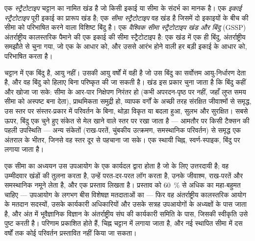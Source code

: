 \begin{definition}[सीमा स्ट्रैटोटाइप, इकाई स्ट्रैटोटाइप, GSSP]\label{def:b1:stratigraphic-scale:gssp}
एक \emph{स्ट्रैटोटाइप} चट्टान का नामित खंड है जो किसी इकाई या सीमा के संदर्भ का मानक है। एक \emph{इकाई स्ट्रैटोटाइप} पूरी इकाई का प्रारूप खंड है; एक \emph{सीमा स्ट्रैटोटाइप} वह खंड है जिसमें दो इकाइयों के बीच की सीमा को परिभाषित करने वाला विशिष्ट बिंदु है। एक \emph{वैश्विक सीमा स्ट्रैटोटाइप खंड और बिंदु} (GSSP) अंतर्राष्ट्रीय कालस्तरिक पैमाने की एक इकाई की सीमा स्ट्रैटोटाइप है: एक खंड में एक ही बिंदु, अंतर्राष्ट्रीय समझौते से चुना गया, जो एक  के आधार को, और उससे आरंभ होने वाली हर बड़ी इकाई के आधार को, परिभाषित करता है।
\end{definition}

 चट्टान में एक बिंदु है, आयु नहीं। उसकी आयु वर्षों में वही है जो उस बिंदु का सर्वोत्तम आयु-निर्धारण देता है, और वह बिंदु को हिलाए बिना परिष्कृत की जा सकती है। खंड इस प्रकार चुना जाता है कि बिंदु कहीं और खोजा जा सके: सीमा के आर-पार निक्षेपण निरंतर हो (कभी अपरदन-पृष्ठ पर नहीं, जहाँ लुप्त समय सीमा को अस्पष्ट बना देता), प्राथमिकता समुद्री हो, व्यापक वर्गों के अच्छी तरह संरक्षित जीवाश्मों से समृद्ध, उस स्तर पर संस्तर-प्रकार में परिवर्तन के बिना, थोड़ा विकृत या बदला हुआ, सुलभ और सुरक्षित। सबसे ऊपर, बिंदु एक चुने हुए संकेत से मेल खाने वाले स्तर पर रखा जाता है --- आमतौर पर किसी टैक्सन की पहली उपस्थिति --- अन्य संकेतों (राख-परतें, चुंबकीय उत्क्रमण, समस्थानिक परिवर्तन) से समृद्ध एक अंतराल के भीतर, जिनसे वह स्तर दूर से पहचाना जा सके। एक स्थायी चिह्न, स्वर्ण-स्पाइक, बिंदु पर लगाया जाता है।

\begin{inthefield}[सीमा कैसे चुनी जाती है]
एक सीमा का अध्ययन उस उपआयोग के एक कार्यदल द्वारा होता है जो  के लिए उत्तरदायी है; वह उम्मीदवार खंडों की तुलना करता है, उन्हें परत-दर-परत लॉग करता है, उनके जीवाश्म, राख-परतें और समस्थानिक नमूने लेता है, और एक प्रस्ताव लिखता है। प्रस्ताव को \qty{60}{\%} से अधिक का महा-बहुमत चाहिए --- उपआयोग के लगभग बीस विशेषज्ञ मतदाताओं का --- फिर वह अंतर्राष्ट्रीय कालस्तरिक आयोग के मतदान सदस्यों, उसके कार्यकारी अधिकारियों और उसके सत्रह उपआयोगों के अध्यक्षों के पास जाता है, और अंत में भूवैज्ञानिक विज्ञान के अंतर्राष्ट्रीय संघ की कार्यकारी समिति के पास, जिसकी स्वीकृति उसे पुष्ट करती है। परिणाम प्रकाशित होते हैं, चिह्न चट्टान में लगाया जाता है, और नई स्थापित सीमा में दस वर्षों तक कोई परिवर्तन प्रस्तावित नहीं किया जा सकता।
\end{inthefield}


